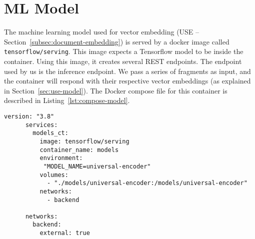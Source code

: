 \section{ML Model}\label{sec:ml-model}
The machine learning model used for vector embedding (USE -- Section~\ref{subsec:document-embedding}) is served by a docker image called \verb|tensorflow/serving|.
This image expects a Tensorflow model to be inside the container.
Using this image, it creates several REST endpoints.
The endpoint used by us is the inference endpoint.
We pass a series of fragments as input, and the container will respond with their respective vector embeddings (as explained in Section~\ref{sec:use-model}).
The Docker compose file for this container is described in Listing~\ref{lst:compose-model}.

\begin{lstlisting}[language=docker-compose,caption={Docker compose for the ml model},label={lst:compose-model},captionpos=b]
      version: "3.8"
      services:
        models_ct:
          image: tensorflow/serving
          container_name: models
          environment:
           "MODEL_NAME=universal-encoder"
          volumes:
            - "./models/universal-encoder:/models/universal-encoder"
          networks:
            - backend

      networks:
        backend:
          external: true
\end{lstlisting}
